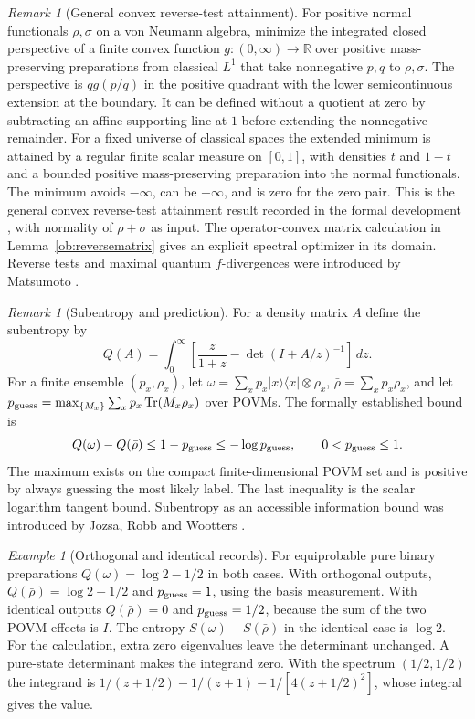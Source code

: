 \documentclass[aps,pra,onecolumn,superscriptaddress,nofootinbib,10pt]{revtex4-2}
\theoremstyle{definition}
\theoremstyle{remark}
\newtheorem{remark}[theorem]{Remark}
\newtheorem{example}[theorem]{Example}
\newcommand{\tr}{\operatorname{Tr}}
\begin{document}
\begin{remark}[General convex reverse-test attainment]\label{ob:reversegeneral}
For positive normal functionals \(\rho,\sigma\) on a von Neumann algebra,
minimize the integrated closed perspective of a finite convex function
\(g:(0,\infty)\to\mathbb R\) over positive mass-preserving preparations
from classical \(L^1\) that take nonnegative \(p,q\) to \(\rho,\sigma\).
The perspective is \(qg(p/q)\) in the positive quadrant with the
lower semicontinuous extension at the boundary. It can be defined
without a quotient at zero by subtracting an affine supporting line at
\(1\) before extending the nonnegative remainder. For a fixed universe
of classical spaces the extended minimum is attained by a regular
finite scalar measure on \([0,1]\), with densities \(t\) and \(1-t\) and
a bounded positive mass-preserving preparation into the normal
functionals. The minimum avoids \(-\infty\), can be \(+\infty\), and is
zero for the zero pair. This is the general convex reverse-test
attainment result recorded in the formal development \cite{obr:leanreverse}, with normality
of \(\rho+\sigma\) as input. The operator-convex matrix calculation in
Lemma~\ref{ob:reversematrix} gives an explicit spectral optimizer
in its domain. Reverse tests and maximal quantum \(f\)-divergences
were introduced by Matsumoto \cite{obr:matsumoto}.
\end{remark}

\begin{remark}[Subentropy and prediction]\label{ob:subentropy}
For a density matrix \(A\) define the subentropy by
\[
 Q(A)=\int_0^\infty
 \left[\frac{z}{1+z}-\det(I+A/z)^{-1}\right]\,dz .
\]
For a finite ensemble \((p_x,\rho_x)\), let
\(\omega=\sum_x p_x |x\rangle\langle x|\otimes\rho_x\),
\(\bar\rho=\sum_xp_x\rho_x\), and let
\(p_{\rm guess}=\max_{\{M_x\}}\sum_xp_x\tr(M_x\rho_x)\) over POVMs.
The formally established bound \cite{obr:leansubentropy} is
\[
 Q(\omega)-Q(\bar\rho)\le1-p_{\rm guess}\le-\log p_{\rm guess},
 \qquad 0<p_{\rm guess}\le1 .
\]
The maximum exists on the compact finite-dimensional POVM set and is
positive by always guessing the most likely label. The last inequality
is the scalar logarithm tangent bound. Subentropy as an accessible
information bound was introduced by Jozsa, Robb and Wootters
\cite{obr:jrw}.
\end{remark}

\begin{example}[Orthogonal and identical records]\label{ob:subentropyexample}
For equiprobable pure binary preparations \(Q(\omega)=\log2-1/2\)
in both cases. With orthogonal outputs,
\(Q(\bar\rho)=\log2-1/2\) and \(p_{\rm guess}=1\), using the basis
measurement. With identical outputs \(Q(\bar\rho)=0\) and
\(p_{\rm guess}=1/2\), because the sum of the two POVM effects is
\(I\). The entropy \(S(\omega)-S(\bar\rho)\) in the identical case is
\(\log2\). For the calculation, extra zero eigenvalues leave the
determinant unchanged. A pure-state determinant makes the integrand
zero. With the spectrum \((1/2,1/2)\) the integrand is
\(1/(z+1/2)-1/(z+1)-1/[4(z+1/2)^2]\), whose integral gives the value.
\end{example}
\end{document}
